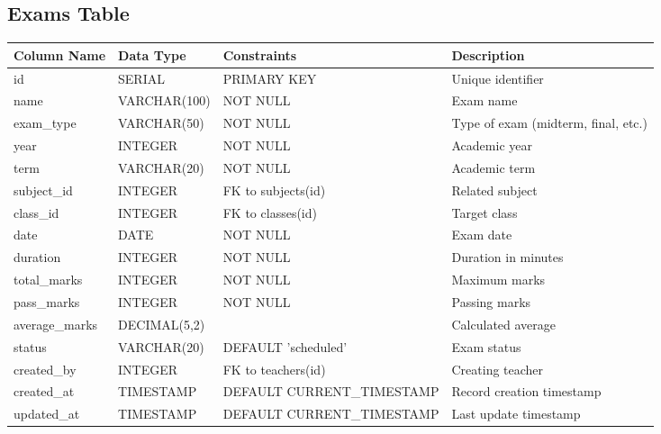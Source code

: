 \documentclass[11pt,a4paper]{article}
\begin{document}
\subsection{Exams Table}
\begin{longtable}{|p{3.5cm}|p{2.5cm}|p{3cm}|p{5.5cm}|}
\hline
\textbf{Column Name} & \textbf{Data Type} & \textbf{Constraints} & \textbf{Description} \\
\hline
\endhead
id & SERIAL & PRIMARY KEY & Unique identifier \\
\hline
name & VARCHAR(100) & NOT NULL & Exam name \\
\hline
exam\_type & VARCHAR(50) & NOT NULL & Type of exam (midterm, final, etc.) \\
\hline
year & INTEGER & NOT NULL & Academic year \\
\hline
term & VARCHAR(20) & NOT NULL & Academic term \\
\hline
subject\_id & INTEGER & FK to subjects(id) & Related subject \\
\hline
class\_id & INTEGER & FK to classes(id) & Target class \\
\hline
date & DATE & NOT NULL & Exam date \\
\hline
duration & INTEGER & NOT NULL & Duration in minutes \\
\hline
total\_marks & INTEGER & NOT NULL & Maximum marks \\
\hline
pass\_marks & INTEGER & NOT NULL & Passing marks \\
\hline
average\_marks & DECIMAL(5,2) & & Calculated average \\
\hline
status & VARCHAR(20) & DEFAULT 'scheduled' & Exam status \\
\hline
created\_by & INTEGER & FK to teachers(id) & Creating teacher \\
\hline
created\_at & TIMESTAMP & DEFAULT CURRENT\_TIMESTAMP & Record creation timestamp \\
\hline
updated\_at & TIMESTAMP & DEFAULT CURRENT\_TIMESTAMP & Last update timestamp \\
\hline
\end{longtable}
\end{document}
